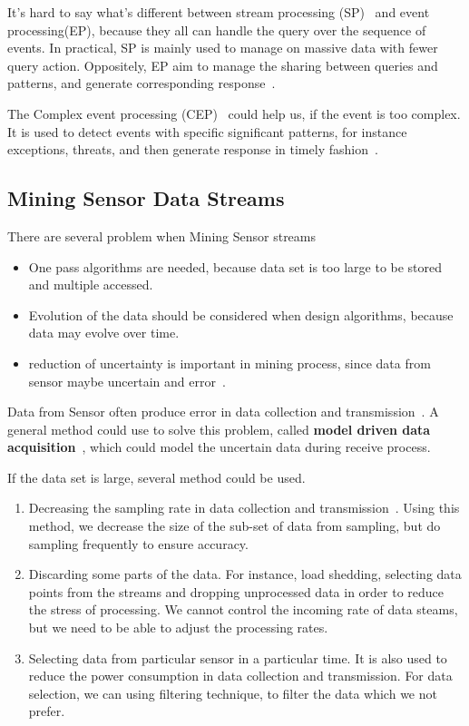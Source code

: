 \documentclass{report}
\begin{document}
It's hard to say what's different between stream processing (SP)~\cite{barga2006consistent} and event processing(EP), because they all can handle the query over the sequence of events. In practical, SP is mainly used to manage on massive data with fewer query action. Oppositely, EP aim to manage the sharing between queries and patterns, and generate corresponding response~\cite{chandy201110201}. 

The Complex event processing (CEP)~\cite{demers2007cayuga} could help us, if the event is too complex. It is used to detect events with specific significant patterns, for instance exceptions, threats, and then generate response in timely fashion~\cite{aggarwal2013managing}.

\subsection{Mining Sensor Data Streams}

There are several problem when Mining Sensor streams

\begin{itemize}
    \item One pass algorithms are needed, because data set is too large to be stored and multiple accessed.
    \item Evolution of the data should be considered when design algorithms, because data may evolve over time.
    \item reduction of uncertainty is important in mining process, since data from sensor maybe uncertain and error~\cite{aggarwal2013managing}.
\end{itemize}

Data from Sensor often produce error in data collection and transmission~\cite{aggarwal2013managing}. A general method could use to solve this problem, called \textbf{model driven data acquisition}~\cite{deshpande2004model}, which could model the uncertain data during receive process.

If the data set is large, several method could be used.
\begin{enumerate}
    \item Decreasing the sampling rate in data collection and transmission~\cite{aggarwal2013managing}. Using this method, we decrease the size of the sub-set of data from sampling, but do sampling frequently to ensure accuracy.
    \item Discarding some parts of the data. For instance, load shedding\cite{aggarwal2013managing}, selecting data points from the streams and dropping unprocessed data in order to reduce the stress of processing. We cannot control the incoming rate of data steams, but we need to be able to adjust the processing rates.
    \item Selecting data from particular sensor in a particular time. It is also used to reduce the power consumption in data collection and transmission. For data selection, we can using filtering technique, to filter the data which we not prefer.
\end{enumerate}
\end{document}
